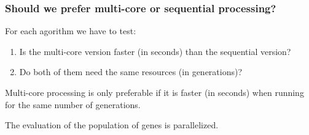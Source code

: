 \begin{frame}
\frametitle{
Should we prefer multi-core or sequential processing?
}
For each agorithm we have to test:
\begin{enumerate}
\item Is the multi-core version faster (in seconds) than the sequential version?
 
\item Do both of them need the same resources (in generations)?
\end{enumerate}
Multi-core processing is only preferable if it is faster (in seconds)
when running for the same number of generations.
 
The evaluation of the population of genes is parallelized.
\end{frame}